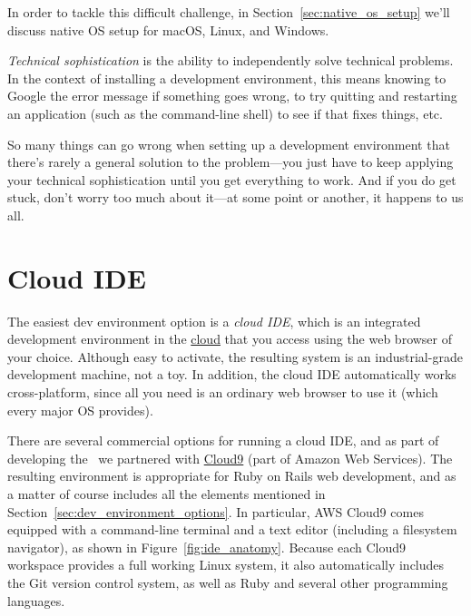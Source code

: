 In order to tackle this difficult challenge, in Section~\ref{sec:native_os_setup} we'll discuss native OS setup for macOS, Linux, and Windows.

\begin{aside}
\label{aside:technical_sophistication}

\emph{Technical sophistication} is the ability to independently solve technical problems. In the context of installing a development environment, this means knowing to Google the error message if something goes wrong, to try quitting and restarting an application (such as the command-line shell) to see if that fixes things, etc.

So many things can go wrong when setting up a development environment that there's rarely a general solution to the problem---you just have to keep applying your technical sophistication until you get everything to work. And if you do get stuck, don't worry too much about it---at some point or another, it happens to us all.

\end{aside}



\section{Cloud IDE}
\label{sec:cloud_ide}

The easiest dev environment option is a \emph{cloud IDE}, which is an integrated development environment in the \href{https://en.wikipedia.org/wiki/Cloud_computing}{cloud} that you access using the web browser of your choice. Although easy to activate, the resulting system is an industrial-grade development machine, not a toy. In addition, the cloud IDE automatically works cross-platform, since all you need is an ordinary web browser to use it (which every major OS provides).

There are several commercial options for running a cloud IDE, and as part of developing the \rort\ we partnered with \href{http://c9.io/}{Cloud9} (part of Amazon Web Services). The resulting environment is appropriate for Ruby on Rails web development, and as a matter of course includes all the elements mentioned in Section~\ref{sec:dev_environment_options}. In particular, AWS Cloud9 comes equipped with a command-line terminal and a text editor (including a filesystem navigator), as shown in Figure~\ref{fig:ide_anatomy}. Because each Cloud9 workspace provides a full working Linux system, it also automatically includes the Git version control system, as well as Ruby and several other programming languages.

